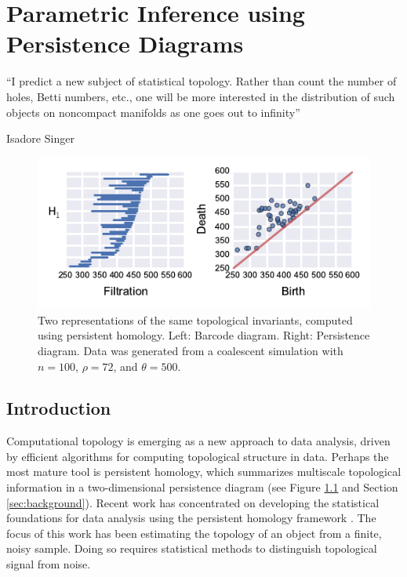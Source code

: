 \chapter{Parametric Inference using Persistence Diagrams}
\label{ch:parametric_inference}

\epigraph{``I predict a new subject of statistical topology. Rather than count the
number of holes, Betti numbers, etc., one will be more interested in the
distribution of such objects on noncompact manifolds as one goes out
to infinity''}{Isadore Singer}

\begin{figure}
\begin{center}
\centerline{\includegraphics[width=\columnwidth]{./fig/persistence_diagram.pdf}}
\caption[Two representations of the same topological invariants computed using persistent homology]{Two representations of the same topological invariants, computed using persistent homology. Left: Barcode diagram. Right: Persistence diagram. Data was generated from a coalescent simulation with $n=100$, $\rho=72$, and $\theta=500$.}
\label{fig:persistence_diagram}
\end{center}
\end{figure}

\section{Introduction}

Computational topology is emerging as a new approach to data analysis, driven by efficient algorithms for computing topological structure in data.
Perhaps the most mature tool is persistent homology, which summarizes multiscale topological information in a two-dimensional persistence diagram (see Figure \ref{fig:persistence_diagram} and Section \ref{sec:background}).
Recent work has concentrated on developing the statistical foundations for data analysis using the persistent homology framework \cite{Fasy:2014,Blumberg:2014bq,Chazal:2014vl}.
The focus of this work has been estimating the topology of an object from a finite, noisy sample.
Doing so requires statistical methods to distinguish topological signal from noise.

